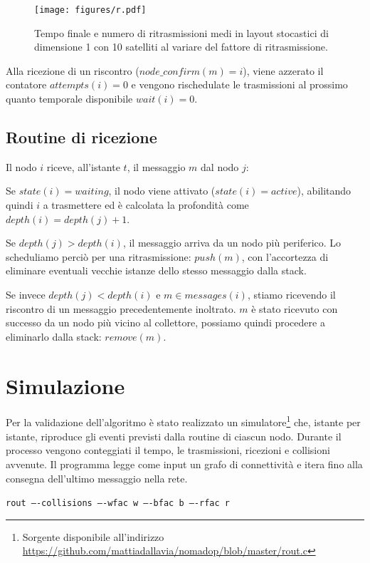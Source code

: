 \documentclass[a4paper,11pt]{article}
\theoremstyle{definition}
\begin{document}
\begin{figure}[H]
\centering
\texttt{[image: figures/r.pdf]}
\caption{Tempo finale e numero di ritrasmissioni medi in layout stocastici di dimensione 1 con 10 satelliti al variare del fattore di ritrasmissione.}
\end{figure}

Alla ricezione di un riscontro ($node\_confirm(m) = i$), viene azzerato il contatore $attempts(i) = 0$ e vengono rischedulate le trasmissioni al prossimo quanto temporale disponibile $wait(i) = 0$.

\subsection{Routine di ricezione}

Il nodo $i$ riceve, all'istante $t$, il messaggio $m$ dal nodo $j$:

Se $state(i) = waiting$, il nodo viene attivato ($state(i) = active$), abilitando quindi $i$ a trasmettere ed è calcolata la profondità come $depth(i) = depth(j)+1$.

Se $depth(j) > depth(i)$, il messaggio arriva da un nodo più periferico. Lo scheduliamo perciò per una ritrasmissione: $push(m)$, con l'accortezza di eliminare eventuali vecchie istanze dello stesso messaggio dalla stack.

Se invece $depth(j) < depth(i)$ e $m \in messages(i)$, stiamo ricevendo il riscontro di un messaggio precedentemente inoltrato. $m$ è stato ricevuto con successo da un nodo più vicino al collettore, possiamo quindi procedere a eliminarlo dalla stack: $remove(m)$.

\section{Simulazione}
\label{simulazione}

Per la validazione dell'algoritmo è stato realizzato un simulatore\footnote{Sorgente disponibile all'indirizzo \url{https://github.com/mattiadallavia/nomadop/blob/master/rout.c}} che, istante per istante, riproduce gli eventi previsti dalla routine di ciascun nodo. Durante il processo vengono conteggiati il tempo, le trasmissioni, ricezioni e collisioni avvenute. Il programma legge come input un grafo di connettività e itera fino alla consegna dell'ultimo messaggio nella rete.

\smallskip

{\centering
\texttt{rout ----collisions ----wfac w ----bfac b ----rfac r}

}
\end{document}
